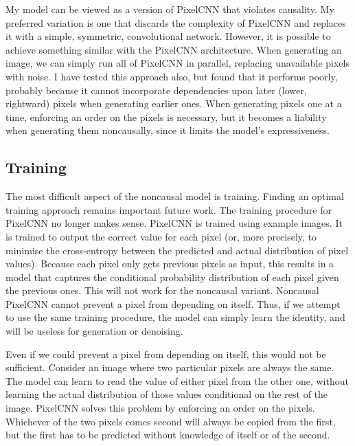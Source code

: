 \documentclass[11pt, a4paper, openany]{book}
\begin{document}
My model can be viewed as a version of PixelCNN that violates causality. My preferred variation is one that discards the complexity of PixelCNN and replaces it with a simple, symmetric, convolutional network. However, it is possible to achieve something similar with the PixelCNN architecture. When generating an image, we can simply run all of PixelCNN in parallel, replacing unavailable pixels with noise. I have tested this approach also, but found that it performs poorly, probably because it cannot incorporate dependencies upon later (lower, rightward) pixels when generating earlier ones. When generating pixels one at a time, enforcing an order on the pixels is necessary, but it becomes a liability when generating them noncausally, since it limits the model's expressiveness.

\subsection{Training} \label{trainingsection}

The most difficult aspect of the noncausal model is training. Finding an optimal training approach remains important future work. The training procedure for PixelCNN no longer makes sense. PixelCNN is trained using example images. It is trained to output the correct value for each pixel (or, more precisely, to minimise the cross-entropy between the predicted and actual distribution of pixel values). Because each pixel only gets previous pixels as input, this results in a model that captures the conditional probability distribution of each pixel given the previous ones. This will not work for the noncausal variant. Noncausal PixelCNN cannot prevent a pixel from depending on itself. Thus, if we attempt to use the same training procedure, the model can simply learn the identity, and will be useless for generation or denoising.

Even if we could prevent a pixel from depending on itself, this would not be sufficient. Consider an image where two particular pixels are always the same. The model can learn to read the value of either pixel from the other one, without learning the actual distribution of those values conditional on the rest of the image. PixelCNN solves this problem by enforcing an order on the pixels. Whichever of the two pixels comes second will always be copied from the first, but the first has to be predicted without knowledge of itself or of the second.
\end{document}

